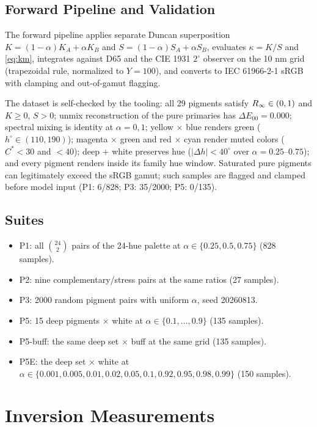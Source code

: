 \subsection{Forward Pipeline and Validation}
The forward pipeline applies separate Duncan superposition $K=(1-\alpha)K_{A}+\alpha K_{B}$ and $S=(1-\alpha)S_{A}+\alpha S_{B}$, evaluates $\kappa=K/S$ and \cref{eq:km}, integrates against D65 and the CIE 1931 $2^{\circ}$ observer on the 10 nm grid (trapezoidal rule, normalized to $Y=100$), and converts to IEC 61966-2-1 sRGB with clamping and out-of-gamut flagging.

The dataset is self-checked by the tooling: all 29 pigments satisfy $R_{\infty}\in(0,1)$ and $K\ge0$, $S>0$; unmix reconstruction of the pure primaries has $\Delta E_{00}=0.000$; spectral mixing is identity at $\alpha=0,1$; yellow $\times$ blue renders green ($h^{\circ}\in(110,190)$); magenta $\times$ green and red $\times$ cyan render muted colors ($C^{\ast}<30$ and $<40$); deep $+$ white preserves hue ($|\Delta h|<40^{\circ}$ over $\alpha=0.25$--$0.75$); and every pigment renders inside its family hue window. Saturated pure pigments can legitimately exceed the sRGB gamut; such samples are flagged and clamped before model input (P1: 6/828; P3: 35/2000; P5: 0/135).

\subsection{Suites}
\begin{itemize}
\item P1: all $\binom{24}{2}$ pairs of the 24-hue palette at $\alpha\in\{0.25,0.5,0.75\}$ (828 samples).
\item P2: nine complementary/stress pairs at the same ratios (27 samples).
\item P3: 2000 random pigment pairs with uniform $\alpha$, seed 20260813.
\item P5: 15 deep pigments $\times$ white at $\alpha\in\{0.1,\dots,0.9\}$ (135 samples).
\item P5-buff: the same deep set $\times$ buff at the same grid (135 samples).
\item P5E: the deep set $\times$ white at $\alpha\in\{0.001,0.005,0.01,0.02,0.05,0.1,0.92,0.95,0.98,0.99\}$ (150 samples).
\end{itemize}

\section{Inversion Measurements}
\label{app:inversion}

